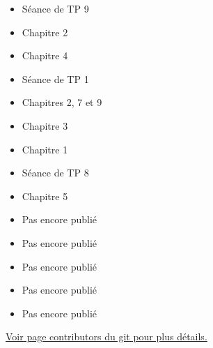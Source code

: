   \begin{itemize}
    \item Séance de TP 9
  \end{itemize}
  \begin{itemize}
    \item Chapitre 2
  \end{itemize}
  \begin{itemize}
    \item Chapitre 4
  \end{itemize}
  \begin{itemize}
    \item Séance de TP 1
  \end{itemize}
  \begin{itemize}
    \item Chapitres 2, 7 et 9
  \end{itemize}
  \begin{itemize}
    \item Chapitre 3
  \end{itemize}
  \begin{itemize}
    \item Chapitre 1
  \end{itemize}
  \begin{itemize}
    \item Séance de TP 8
  \end{itemize}
  \begin{itemize}
    \item Chapitre 5
  \end{itemize}
  \begin{itemize}
    \item Pas encore publié
  \end{itemize}
  \begin{itemize}
    \item Pas encore publié
  \end{itemize}
  \begin{itemize}
    \item Pas encore publié
  \end{itemize}
  \begin{itemize}
    \item Pas encore publié
  \end{itemize}
  \begin{itemize}
    \item Pas encore publié\\
  \end{itemize}
\href{https://github.com/blegat/LINMA1691/graphs/contributors}{Voir page contributors du git pour plus détails.}

\clearpage
\printindex

